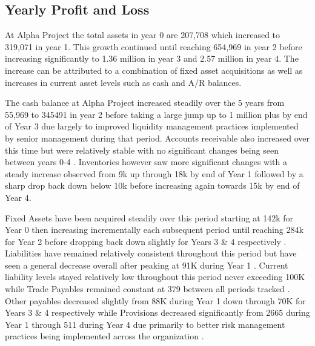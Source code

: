 

\subsection{Yearly Profit and Loss}\label{sec:title}

At Alpha Project the total assets in year 0 are 207,708 which increased to 319,071 in year 1. This growth continued until reaching 654,969 in year 2 before increasing significantly to 1.36 million in year 3 and 2.57 million in year 4. The increase can be attributed to a combination of fixed asset acquisitions as well as increases in current asset levels such as cash and A/R balances. 

The cash balance at Alpha Project increased steadily over the 5 years from 55,969 to 345491 in year 2 before taking a large jump up to 1 million plus by end of Year 3 due largely to improved liquidity management practices implemented by senior management during that period. Accounts receivable also increased over this time but were relatively stable with no significant changes being seen between years 0-4 . Inventories however saw more significant changes with a steady increase observed from 9k up through 18k by end of Year 1 followed by a sharp drop back down below 10k before increasing again towards 15k by end of Year 4. 

Fixed Assets have been acquired steadily over this period starting at 142k for Year 0 then increasing incrementally each subsequent period until reaching 284k for Year 2 before dropping back down slightly for Years 3 & 4 respectively . Liabilities have remained relatively consistent throughout this period but have seen a general decrease overall after peaking at 91K during Year 1 . Current liability levels stayed relatively low throughout this period never exceeding 100K while Trade Payables remained constant at 379 between all periods tracked . Other payables decreased slightly from 88K during Year 1 down through 70K for Years 3 & 4 respectively while Provisions decreased significantly from 2665 during Year 1 through 511 during Year 4 due primarily to better risk management practices being implemented across the organization .  

